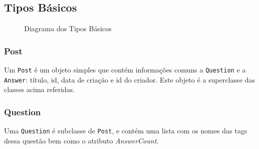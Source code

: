 \documentclass[a4paper]{article}
\begin{document}
	\subsection{Tipos Básicos}

		\begin{figure}
			\centering

		\caption{Diagrama dos Tipos Básicos} \label{diag:basic}
		\end{figure}

		\subsubsection{Post}
			\tab Um \texttt{Post} é um objeto simples que contém informações comuns a \texttt{Question}
			e a \texttt{Answer}: título, id, data de criação e id do criador. Este objeto
			é a superclasse das classes acima referidas.

		\subsubsection{Question}
			\tab Uma \texttt{Question} é subclasse de \texttt{Post}, e contém uma lista
			com os nomes das tags dessa questão bem como o atributo \textit{AnswerCount}.
\end{document}
